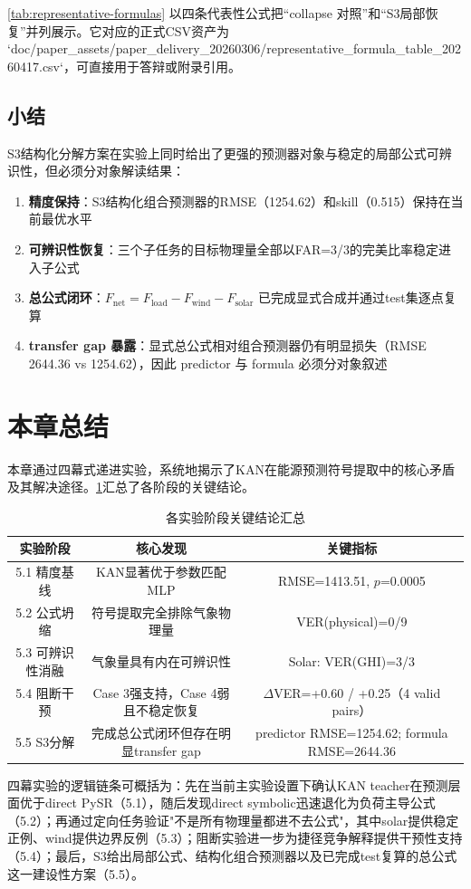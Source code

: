\cref{tab:representative-formulas} 以四条代表性公式把“collapse 对照”和“S3局部恢复”并列展示。它对应的正式CSV资产为 `doc/paper_assets/paper_delivery_20260306/representative_formula_table_20260417.csv`，可直接用于答辩或附录引用。

\subsection{小结}

S3结构化分解方案在实验上同时给出了更强的预测器对象与稳定的局部公式可辨识性，但必须分对象解读结果：
\begin{enumerate}
  \item \textbf{精度保持}：S3结构化组合预测器的RMSE（1254.62）和skill（0.515）保持在当前最优水平
  \item \textbf{可辨识性恢复}：三个子任务的目标物理量全部以FAR=3/3的完美比率稳定进入子公式
  \item \textbf{总公式闭环}：$F_{\text{net}} = F_{\text{load}} - F_{\text{wind}} - F_{\text{solar}}$ 已完成显式合成并通过test集逐点复算
  \item \textbf{transfer gap 暴露}：显式总公式相对组合预测器仍有明显损失（RMSE 2644.36 vs 1254.62），因此 predictor 与 formula 必须分对象叙述
\end{enumerate}

\section{本章总结}

本章通过四幕式递进实验，系统地揭示了KAN在能源预测符号提取中的核心矛盾及其解决途径。\cref{tab:chapter-summary}汇总了各阶段的关键结论。

\begin{table}[htbp]
\centering
\caption{各实验阶段关键结论汇总}
\label{tab:chapter-summary}
\begin{tabular}{ccc}
\toprule
实验阶段 & 核心发现 & 关键指标 \\
\midrule
5.1 精度基线 & KAN显著优于参数匹配MLP & RMSE=1413.51, $p$=0.0005 \\
5.2 公式坍缩 & 符号提取完全排除气象物理量 & VER(physical)=0/9 \\
5.3 可辨识性消融 & 气象量具有内在可辨识性 & Solar: VER(GHI)=3/3 \\
5.4 阻断干预 & Case 3强支持，Case 4弱且不稳定恢复 & $\Delta$VER=+0.60 / +0.25（4 valid pairs） \\
5.5 S3分解 & 完成总公式闭环但存在明显transfer gap & predictor RMSE=1254.62; formula RMSE=2644.36 \\
\bottomrule
\end{tabular}
\end{table}

四幕实验的逻辑链条可概括为：先在当前主实验设置下确认KAN teacher在预测层面优于direct PySR（5.1），随后发现direct symbolic迅速退化为负荷主导公式（5.2）；再通过定向任务验证"不是所有物理量都进不去公式"，其中solar提供稳定正例、wind提供边界反例（5.3）；阻断实验进一步为捷径竞争解释提供干预性支持（5.4）；最后，S3给出局部公式、结构化组合预测器以及已完成test复算的总公式这一建设性方案（5.5）。
